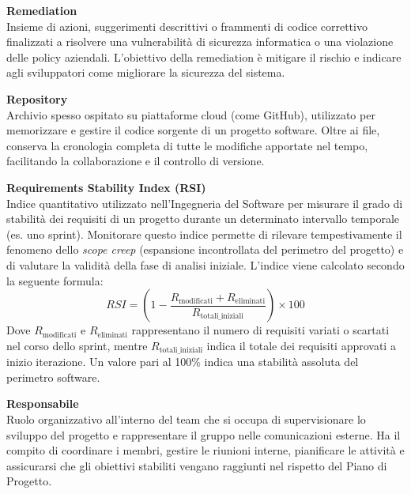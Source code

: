 \documentclass[12pt, a4paper]{article}
\begin{document}
\noindent\hypertarget{remediation}{\textbf{Remediation}} \\[0.1em]
Insieme di azioni, suggerimenti descrittivi o frammenti di codice correttivo finalizzati a risolvere una vulnerabilità di sicurezza informatica o una violazione delle policy aziendali. L'obiettivo della remediation è mitigare il rischio e indicare agli sviluppatori come migliorare la sicurezza del sistema.
\vspace{0.5cm}

\noindent\hypertarget{repository}{\textbf{Repository}} \\[0.1em]
Archivio spesso ospitato su piattaforme cloud (come GitHub), utilizzato per memorizzare e gestire il codice sorgente di un progetto software. Oltre ai file, conserva la cronologia completa di tutte le modifiche apportate nel tempo, facilitando la collaborazione e il controllo di versione.
\vspace{0.5cm}

\noindent\hypertarget{requirements-stability-index}{\textbf{Requirements Stability Index (RSI)}} \\[0.1em]
Indice quantitativo utilizzato nell'Ingegneria del Software per misurare il grado di stabilità dei requisiti di un progetto durante un determinato intervallo temporale (es. uno sprint). Monitorare questo indice permette di rilevare tempestivamente il fenomeno dello \textit{scope creep} (espansione incontrollata del perimetro del progetto) e di valutare la validità della fase di analisi iniziale. L'indice viene calcolato secondo la seguente formula:
\begin{equation}
RSI = \left( 1 - \frac{R_{\text{modificati}} + R_{\text{eliminati}}}{R_{\text{totali\_iniziali}}} \right) \times 100
\end{equation}
Dove $R_{\text{modificati}}$ e $R_{\text{eliminati}}$ rappresentano il numero di requisiti variati o scartati nel corso dello sprint, mentre $R_{\text{totali\_iniziali}}$ indica il totale dei requisiti approvati a inizio iterazione. Un valore pari al 100\% indica una stabilità assoluta del perimetro software.
\vspace{0.5cm}

\noindent\hypertarget{responsabile}{\textbf{Responsabile}} \\[0.1em]
Ruolo organizzativo all'interno del team che si occupa di supervisionare lo sviluppo del progetto e rappresentare il gruppo nelle comunicazioni esterne. Ha il compito di coordinare i membri, gestire le riunioni interne, pianificare le attività e assicurarsi che gli obiettivi stabiliti vengano raggiunti nel rispetto del Piano di Progetto.
\vspace{0.5cm}
\end{document}
